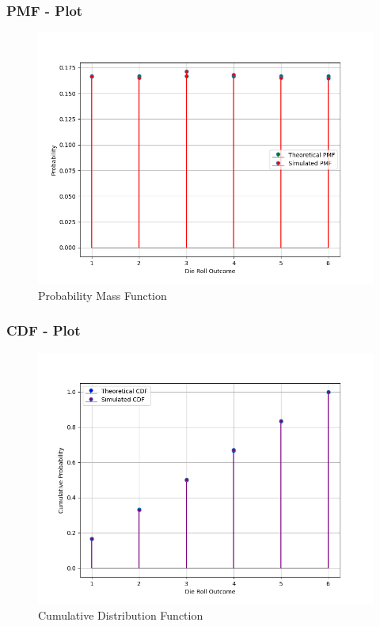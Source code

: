 \documentclass{beamer}
\begin{document}
\begin{frame}
\frametitle{PMF - Plot}
\begin{figure}[h]
\centering
\includegraphics[width=\textwidth]{Figs/Figure_1 (1).png}
\caption{Probability Mass Function}
\label{fig:Plot1} 
\end{figure}
\end{frame}

\begin{frame}
\frametitle{CDF - Plot}
\begin{figure}[h]
\centering
\includegraphics[width=\textwidth]{Figs/Figure_2.png}
\caption{Cumulative Distribution Function}
\label{fig:Plot2} 
\end{figure}
\end{frame}
\end{document}
